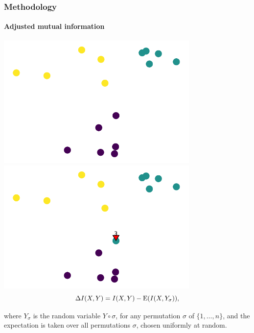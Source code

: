\documentclass{tum-presentation}
\def\E{{\rm E}}
\def\ia{\Delta I}
\begin{document}
\begin{frame} 
	\frametitle{Methodology}
	\framesubtitle{Adjusted mutual information}
	\begin{center}
		\includegraphics[width = 10cm]{../figures/cloud_cluster_1.pdf}\hspace{.5cm}\vline\hspace{.5cm}
		\includegraphics[width = 10cm]{../figures/cloud_cluster_2.pdf}
		$$
		\ia(X,Y) = I(X,Y) - \E(I(X, Y_\sigma)),
		$$
		
		where  $Y_\sigma$ is the random variable $Y \circ \sigma$, for any permutation $\sigma$ of $\{1,\ldots, n\}$, and the expectation is taken over all permutations $\sigma$, chosen uniformly at random. 

	\end{center}
\end{frame}
\end{document}
